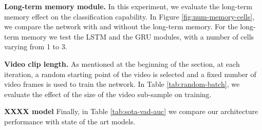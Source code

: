 
\noindent\textbf{Long-term memory module.}
In this experiment, we evaluate the long-term memory effect on the classification capability.
In Figure \ref{fig:num-memory-cells}, we compare the network with and without the long-term memory.
For the long-term memory we test the LSTM and the GRU modules, with a number of cells varying from 1 to 3.


\noindent\textbf{Video clip length.}
As mentioned at the beginning of the section, at each iteration, a random starting point of the video is selected and a fixed number of video frames is used to train the network.
In Table \ref{tab:random-batch}, we evaluate the effect of the size of the video sub-sample on training.

\noindent\textbf{XXXX model}
Finally, in Table \ref{tab:sota-vad-auc} we compare our architecture performance with state of the art models.
